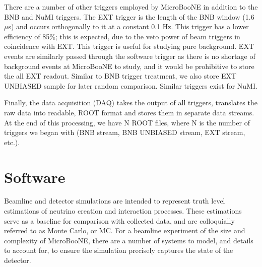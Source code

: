 \par There are a number of other triggers employed by MicroBooNE in addition to the BNB and NuMI triggers. The EXT trigger is the length of the BNB window (1.6 $\mu$s) and occurs orthogonally to it at a constant 0.1 Hz. This trigger has a lower efficiency of 85\%; this is expected, due to the veto power of beam triggers in coincidence with EXT.  This trigger is useful for studying pure background. EXT events are similarly passed through the software trigger as there is no shortage of background events at MicroBooNE to study, and it would be prohibitive to store the all EXT readout. Similar to BNB trigger treatment, we also store EXT UNBIASED sample for later random comparison. Similar triggers exist for NuMI.
\par Finally, the data acquisition (DAQ) takes the output of all triggers, translates the raw data into readable, ROOT \cite{bib:root} format  and stores them in separate data streams. At the end of this processing, we have N ROOT files, where N is the number of triggers we began with (BNB stream, BNB UNBIASED stream, EXT stream, etc.). 

\clearpage

\section{Software} \label{sec:software}
Beamline and detector simulations are intended to represent truth level estimations of neutrino creation and interaction processes. These estimations serve as a baseline for comparison with collected data, and are colloquially referred to as Monte Carlo, or MC.  For a beamline experiment of the size and complexity of MicroBooNE, there are a number of systems to model, and details to account for, to ensure the simulation precisely captures the state of the detector. 


